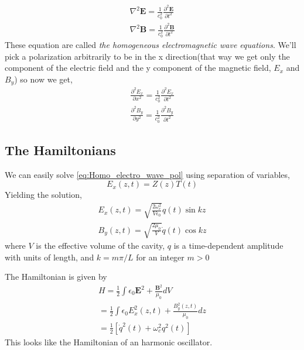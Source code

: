 \documentclass{article}
\numberwithin{equation}{section} %
\begin{document}
\begin{equation} \label{eq:Homo_electro_wave}
    \begin{split}
        \nabla^2 \textbf{E} = \frac{1}{c_0^2}\frac{\partial^2 \textbf{E}}{\partial t^2} \\
        \nabla^2 \textbf{B} = \frac{1}{c_0^2}\frac{\partial^2 \textbf{B}}{\partial t^2}
    \end{split}
\end{equation}
These equation are called \textit{the homogeneous electromagnetic wave equations}.
We'll pick a polarization arbitrarily to be in the x direction(that way we get only the component of the electric field and the y component of the magnetic field, $E_x$ and $B_y$) so now we get,
\begin{equation} \label{eq:Homo_electro_wave_pol}
    \begin{split}
        \frac{\partial^2 E_x}{\partial x^2} = \frac{1}{c_0^2}\frac{\partial^2 E_x}{\partial t^2} \\
        \frac{\partial^2 B_y}{\partial y^2} = \frac{1}{c_0^2}\frac{\partial^2 B_y}{\partial t^2} 
    \end{split}
\end{equation}
\subsection{The Hamiltonians}
We can easily solve \ref{eq:Homo_electro_wave_pol} using separation of variables,
$$E_x(z, t)= Z(z)T(t)$$
Yielding the solution,
\begin{equation}
    \begin{split}
        E_x(z, t) = \sqrt{\frac{2 \omega_c^2}{V \epsilon_0}}q(t)\sin{kz} \\
        B_y(z, t) = \sqrt{\frac{2 \mu_0}{V}}\dot{q}(t)\cos{kz}
    \end{split}
\end{equation}
where $V$ is the effective volume of the cavity, $q$ is a time-dependent amplitude with units of length, and $k = m\pi/L$ for
an integer $m > 0$

The Hamiltonian is given by
\begin{equation}
    \begin{split}
        H = \frac{1}{2}\int\epsilon_0 \textbf{E}^2 + \frac{\textbf{B}^2}{\mu_0} dV \\
        = \frac{1}{2}\int\epsilon_0 E_x^2(z, t) + \frac{B_y^2(z, t)}{\mu_0} dz \\
        = \frac{1}{2}[\dot{q}^2(t) + \omega_c^2 q^2(t)]
    \end{split}
\end{equation}
This looks like the Hamiltonian of an harmonic oscillator.
\end{document}
